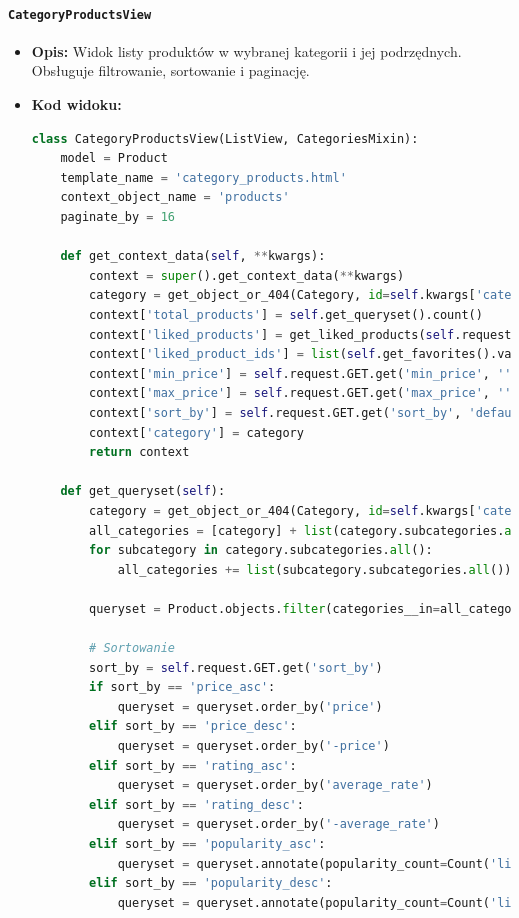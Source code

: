 \documentclass[12pt,a4paper,oneside]{article}
\theoremstyle{definition}
\numberwithin{equation}{section}
\begin{document}
\paragraph{\texttt{CategoryProductsView}}
\begin{itemize}
    \item \textbf{Opis:} Widok listy produktów w wybranej kategorii i jej podrzędnych. Obsługuje filtrowanie, sortowanie i paginację.
    \item \textbf{Kod widoku:}
\begin{lstlisting}[language=Python, caption=Kod widoku CategoryProductsView]
class CategoryProductsView(ListView, CategoriesMixin):
    model = Product
    template_name = 'category_products.html'
    context_object_name = 'products'
    paginate_by = 16

    def get_context_data(self, **kwargs):
        context = super().get_context_data(**kwargs)
        category = get_object_or_404(Category, id=self.kwargs['category_id'])
        context['total_products'] = self.get_queryset().count()
        context['liked_products'] = get_liked_products(self.request)
        context['liked_product_ids'] = list(self.get_favorites().values_list('id', flat=True))
        context['min_price'] = self.request.GET.get('min_price', '')
        context['max_price'] = self.request.GET.get('max_price', '')
        context['sort_by'] = self.request.GET.get('sort_by', 'default')
        context['category'] = category
        return context

    def get_queryset(self):
        category = get_object_or_404(Category, id=self.kwargs['category_id'])
        all_categories = [category] + list(category.subcategories.all())
        for subcategory in category.subcategories.all():
            all_categories += list(subcategory.subcategories.all())

        queryset = Product.objects.filter(categories__in=all_categories).distinct()

        # Sortowanie
        sort_by = self.request.GET.get('sort_by')
        if sort_by == 'price_asc':
            queryset = queryset.order_by('price')
        elif sort_by == 'price_desc':
            queryset = queryset.order_by('-price')
        elif sort_by == 'rating_asc':
            queryset = queryset.order_by('average_rate')
        elif sort_by == 'rating_desc':
            queryset = queryset.order_by('-average_rate')
        elif sort_by == 'popularity_asc':
            queryset = queryset.annotate(popularity_count=Count('liked_by')).order_by('popularity_count')
        elif sort_by == 'popularity_desc':
            queryset = queryset.annotate(popularity_count=Count('liked_by')).order_by('-popularity_count')


\end{lstlisting}
\end{itemize}
\end{document}
